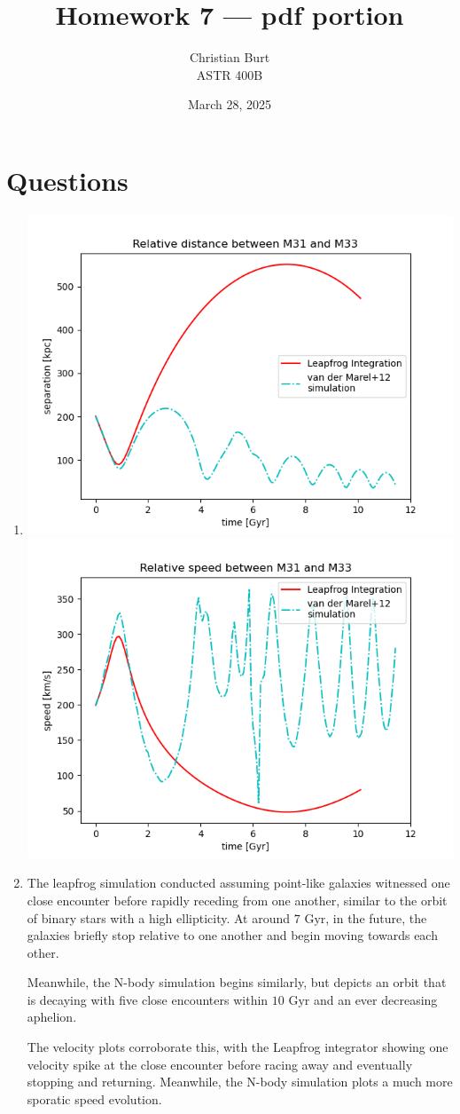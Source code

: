 \documentclass{article}
\title{Homework 7 — pdf portion}
\author{Christian Burt\\ASTR 400B}
\date{March 28, 2025}
\begin{document}
\maketitle
\setcounter{section}{4} %
    
    \section{Questions}

    \begin{enumerate}

    \item \includegraphics[width=0.5\linewidth]{M33-M31-rel-pos.png}
      \includegraphics[width=0.5\linewidth]{M33-M31-rel-vel.png}

    \item The leapfrog simulation conducted assuming point-like
      galaxies witnessed one close encounter before rapidly receding
      from one another, similar to the orbit of binary stars with a
      high ellipticity. At around $7\,\,\text{Gyr}$, in the future, the galaxies
      briefly stop relative to one another and begin moving towards
      each other.
      
      Meanwhile, the N-body simulation begins
      similarly, but depicts an orbit that is decaying with five close
      encounters within $10\,\,\text{Gyr}$ and an ever decreasing aphelion.

      The velocity plots corroborate this, with the Leapfrog
      integrator showing one velocity spike at the close encounter
      before racing away and eventually stopping and
      returning. Meanwhile, the N-body simulation plots a much more
      sporatic speed evolution.
      

\end{enumerate}
\end{document}
